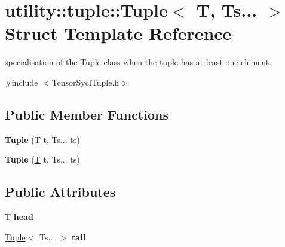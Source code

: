 \hypertarget{structutility_1_1tuple_1_1_tuple_3_01_t_00_01_ts_8_8_8_01_4}{}\section{utility\+:\+:tuple\+:\+:Tuple$<$ T, Ts... $>$ Struct Template Reference}
\label{structutility_1_1tuple_1_1_tuple_3_01_t_00_01_ts_8_8_8_01_4}


specialisation of the \hyperlink{structutility_1_1tuple_1_1_tuple}{Tuple} class when the tuple has at least one element.  




{\ttfamily \#include $<$Tensor\+Sycl\+Tuple.\+h$>$}

\subsection*{Public Member Functions}
\begin{DoxyCompactItemize}
\item 
\mbox{\label{structutility_1_1tuple_1_1_tuple_3_01_t_00_01_ts_8_8_8_01_4_a536c73f858c22e62ab6b3bbe4daad4ca}} 
{\bfseries Tuple} (\hyperlink{group___sparse_core___module}{T} t, Ts... ts)
\item 
\mbox{\label{structutility_1_1tuple_1_1_tuple_3_01_t_00_01_ts_8_8_8_01_4_a536c73f858c22e62ab6b3bbe4daad4ca}} 
{\bfseries Tuple} (\hyperlink{group___sparse_core___module}{T} t, Ts... ts)
\end{DoxyCompactItemize}
\subsection*{Public Attributes}
\begin{DoxyCompactItemize}
\item 
\mbox{\label{structutility_1_1tuple_1_1_tuple_3_01_t_00_01_ts_8_8_8_01_4_a188f6eb67eafad3ac61ba2f1e555dc72}} 
\hyperlink{group___sparse_core___module}{T} {\bfseries head}
\item 
\mbox{\label{structutility_1_1tuple_1_1_tuple_3_01_t_00_01_ts_8_8_8_01_4_a242a1a1fd14b2b287a36a496eaf5d90b}} 
\hyperlink{structutility_1_1tuple_1_1_tuple}{Tuple}$<$ Ts... $>$ {\bfseries tail}
\end{DoxyCompactItemize}


